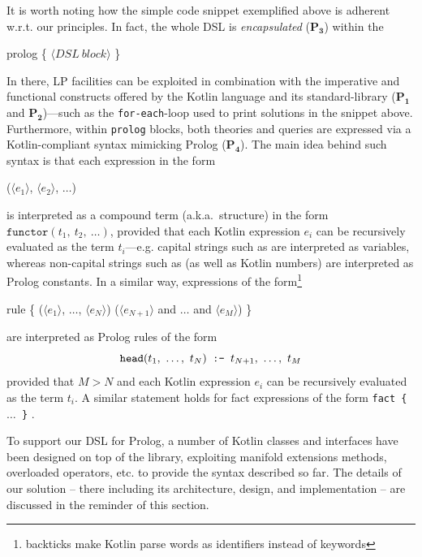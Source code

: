 \documentclass[12pt,a4paper,openright,twoside]{book}
\begin{document}
It is worth noting how the simple code snippet exemplified above is adherent w.r.t. our principles.
%
In fact, the whole DSL is \emph{encapsulated} ($\mathbf{P_3}$) within the
%
\begin{center}\ttfamily
    prolog \{ $\langle DSL\ block \rangle$ \}
\end{center}
%
In there, LP facilities can be exploited in combination with the imperative and functional constructs offered by the Kotlin language and its standard-library ($\mathbf{P_1}$ and $\mathbf{P_2}$)---such as the \texttt{for-each}-loop used to print solutions in the snippet above.
%
Furthermore, within \texttt{prolog} blocks, both theories and queries are expressed via a Kotlin-compliant syntax mimicking Prolog ($\mathbf{P_4}$).
%
The main idea behind such syntax is that each expression in the form
%
\begin{center}\ttfamily
    ($\langle e_1 \rangle$, $\langle e_2 \rangle$, $\ldots$)
\end{center}
%
is interpreted as a compound term (a.k.a.\ structure) in the form
$\texttt{functor}(t_1,\ t_2,\ \ldots)$,
provided that each Kotlin expression $e_i$ can be recursively evaluated as the term $t_i$---e.g. capital strings such as  are interpreted as variables, whereas non-capital strings such as  (as well as Kotlin numbers) are interpreted as Prolog constants.
%
In a similar way, expressions of the form\footnote{backticks make Kotlin parse words as identifiers instead of keywords}
%
\begin{center}\ttfamily
    rule \{ ($\langle e_1 \rangle$, $\ldots$,  $\langle e_N \rangle$)  ($\langle e_{N+1} \rangle$ and $\ldots$ and $\langle e_M \rangle$) \}
\end{center}
%
are interpreted as Prolog rules of the form
\[
    \texttt{head}(t_1,\ \ldots,\ t_N) \texttt{ :- } t_{N+1},\ \ldots,\ t_M
\]
provided that $M > N$ and each Kotlin expression $e_i$ can be recursively evaluated as the term $t_i$.
%
A similar statement holds for fact expressions of the form \texttt{fact \{ $\ldots$ \}} .

To support our DSL for Prolog, a number of Kotlin classes and interfaces have been designed on top of the \twopkt{} library, exploiting manifold extensions methods, overloaded operators, etc. to provide the syntax described so far.
%
The details of our solution -- there including its architecture, design, and implementation -- are discussed in the reminder of this section.
\end{document}
